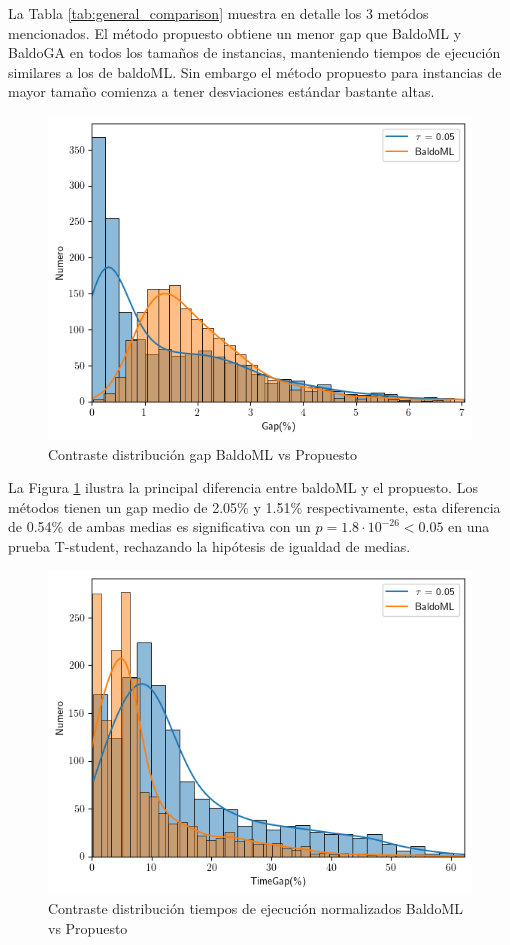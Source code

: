\documentclass[spanish, a4paper, 12pt, openany,final]{book}
\begin{document}
La Tabla \ref{tab:general_comparison} muestra en detalle los 3 metódos mencionados. El método propuesto obtiene un menor gap que BaldoML y BaldoGA en todos los tamaños de instancias, manteniendo tiempos de ejecución similares a los de baldoML. Sin embargo el método propuesto para instancias de mayor tamaño comienza a tener desviaciones estándar bastante altas.


\begin{figure}[H]
	\includegraphics{graphs/distributions.png}
	\caption{Contraste distribución gap BaldoML vs Propuesto}\label{fig:distributions}
\end{figure}

La Figura \ref{fig:distributions} ilustra la principal diferencia entre baldoML y el propuesto. Los métodos tienen un gap medio de 2.05\% y 1.51\% respectivamente, esta diferencia de 0.54\% de ambas medias es significativa con un $p = 1.8\cdot10^{-26} < 0.05$ en una prueba T-student, rechazando la hipótesis de igualdad de medias.

\begin{figure}[H]
	\includegraphics{graphs/distributions_times.png}	
	\caption{Contraste distribución tiempos de ejecución normalizados BaldoML vs Propuesto}\label{fig:distributions_times}
\end{figure}
\end{document}
